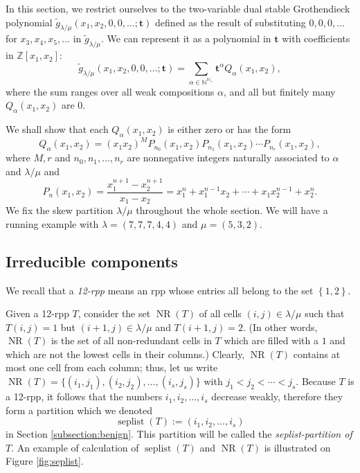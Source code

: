 \documentclass[numbers=enddot,12pt,final,onecolumn,notitlepage]{scrartcl}%
\theoremstyle{definition}
\newcommand{\kk}{\mathbf{k}}
\let\sumnonlimits\sum
\renewcommand{\sum}{\sumnonlimits\limits}
\def\seplist{{\operatorname{seplist}}} %
\def\ceqvar{{{\alpha}}} %
\def\NS{{\operatorname{NR}}}
\def\g{{\widetilde{g}}}
\def\t{{\mathbf{t}}}
\def\lm{{\lambda/\mu}}
\def\N{{\mathbb{N}}}
\def\Z{{\mathbb{Z}}}
\begin{document}
In this section, 
we restrict ourselves to the
two-variable dual stable Grothendieck polynomial
$\g_\lm(x_1,x_2,0,0,\dots;\t)$ defined as the result of
substituting $0, 0, 0, \ldots$ for $x_3, x_4, x_5, \ldots$
in $\g_\lm$. We can represent it as a polynomial in
$\t$ with coefficients in $\Z[x_1,x_2]$:
$$\g_\lm(x_1,x_2,0,0,\dots;\t)=\sum_{\ceqvar\in \N^{\N_+}}\t^\ceqvar Q_\ceqvar(x_1,x_2),$$
where the sum ranges over all weak compositions $\alpha$,
and all but finitely many $Q_\ceqvar(x_1,x_2)$ are $0$.

We shall show that each $Q_\ceqvar(x_1,x_2)$ is either zero or has the form
\begin{equation}
\label{eq.Qalpha}
Q_\ceqvar(x_1,x_2)=(x_1x_2)^{M} P_{n_0}(x_1,x_2)P_{n_1}(x_1,x_2)\cdots P_{n_r}(x_1,x_2) , 
\end{equation}
where $M,r$ and $n_0,n_1,\dots,n_{r}$ are nonnegative integers naturally associated to $\ceqvar$ and $\lm$ and 
$$P_n(x_1,x_2)=\frac{x_1^{n+1}-x_2^{n+1}}{x_1-x_2}=x_1^{n}+x_1^{n-1}x_2+\cdots+x_1x_2^{n-1}+x_2^n.$$
We fix the skew partition $\lm$ throughout the whole section.
We will have a running example with $\lambda=(7,7,7,4,4)$ and $\mu=(5,3,2)$.


\subsection{Irreducible components}
We recall that a \textit{12-rpp} means an rpp whose entries all belong to the set $\left\{1, 2\right\}$. 

Given a 12-rpp $T$, consider the set $\NS(T)$ of all cells $(i,j)\in \lm$ such that $T(i,j)=1$ but $(i+1,j) \in \lm$ and $T(i+1,j)=2$. (In other words, $\NS(T)$ is the set of all non-redundant cells in $T$ which are filled with a $1$ and which are not the lowest cells in their columns.)
Clearly, $\NS(T)$ contains at most one cell from each column; thus, let us write $\NS(T)=\{(i_1,j_1),(i_2,j_2),\dots,(i_s,j_s)\}$ with $j_1<j_2<\cdots<j_s$. Because $T$ is a 12-rpp, it follows that the numbers $i_1,i_2,\dots,i_s$ decrease weakly, therefore they form a partition which we
denoted 
$$\seplist(T):=(i_1,i_2,\dots,i_s)$$ 
in Section \ref{subsection:benign}. This partition
will be called the \textit{seplist-partition of $T$}.
An example of calculation of $\seplist(T)$ and $\NS(T)$ is illustrated on Figure \ref{fig:seplist}. 
\end{document}
